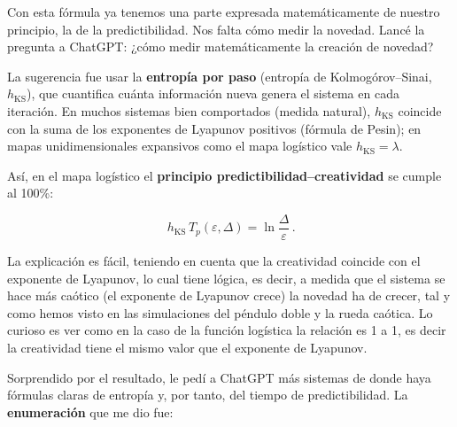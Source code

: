 \documentclass[
  10pt,
  a4paper,
  DIV=11,
  numbers=noendperiod,
  open=any]{scrreprt}
\numberwithin{equation}{chapter}
\numberwithin{equation}{section}
\renewcommand{\[}{\begin{equation}}
\renewcommand{\]}{\end{equation}}
\begin{document}
Con esta fórmula ya tenemos una parte expresada matemáticamente de nuestro principio, la de la predictibilidad. Nos falta cómo medir la novedad. Lancé la pregunta a ChatGPT: ¿cómo medir matemáticamente la creación de novedad? 

La sugerencia fue usar la \textbf{entropía por paso} (entropía de Kolmogórov--Sinai, $h_{\mathrm{KS}}$), que cuantifica cuánta información nueva genera el sistema en cada iteración. En muchos sistemas bien comportados (medida natural), $h_{\mathrm{KS}}$ coincide con la suma de los exponentes de Lyapunov positivos (fórmula de Pesin); en mapas unidimensionales expansivos como el mapa logístico vale $h_{\mathrm{KS}}=\lambda$.  

Así, en el mapa logístico el \textbf{principio predictibilidad--creatividad} se cumple al 100\%:

\[
\boxed{\,h_{\mathrm{KS}}\,T_p(\varepsilon,\Delta)=\ln\!\frac{\Delta}{\varepsilon}\,}.
\]


La explicación es fácil, teniendo en cuenta que la creatividad coincide con el exponente de Lyapunov, lo cual tiene lógica, es decir, a medida que el sistema se hace más caótico (el exponente de Lyapunov crece) la novedad ha de crecer, tal y como hemos visto en las simulaciones del péndulo doble y la rueda caótica. Lo curioso es ver como en la caso de la función logística la relación es 1 a 1, es decir la creatividad tiene el mismo valor que el exponente de Lyapunov.

Sorprendido por el resultado, le pedí a ChatGPT más sistemas de donde haya fórmulas claras de entropía y, por tanto, del tiempo de predictibilidad. La \textbf{enumeración} que me dio fue:
\end{document}

